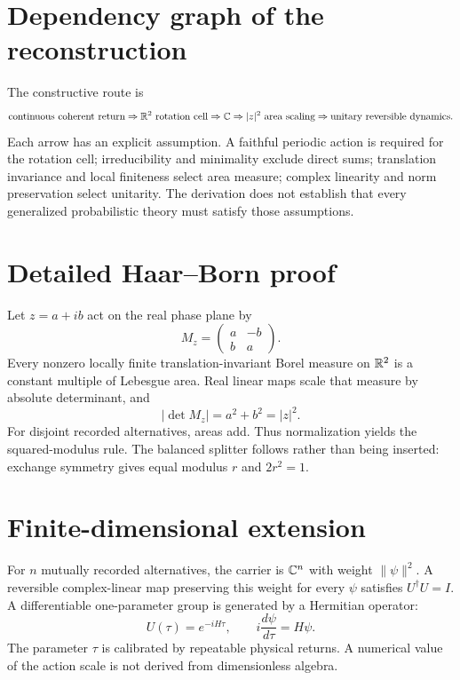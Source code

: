\documentclass[11pt,a4paper]{article}
\begin{document}
\section{Dependency graph of the reconstruction}
The constructive route is
\begin{equation}
\text{continuous coherent return}
\Rightarrow \mathbb{R}^2\text{ rotation cell}
\Rightarrow \mathbb{C}
\Rightarrow |z|^2\text{ area scaling}
\Rightarrow \text{unitary reversible dynamics}.
\end{equation}
Each arrow has an explicit assumption. A faithful periodic action is required for the rotation cell; irreducibility and minimality exclude direct sums; translation invariance and local finiteness select area measure; complex linearity and norm preservation select unitarity. The derivation does not establish that every generalized probabilistic theory must satisfy those assumptions.

\section{Detailed Haar--Born proof}
Let $z=a+ib$ act on the real phase plane by
\begin{equation}
M_z=\begin{pmatrix}a&-b\\b&a\end{pmatrix}.
\end{equation}
Every nonzero locally finite translation-invariant Borel measure on $\mathbb{R}^2$ is a constant multiple of Lebesgue area. Real linear maps scale that measure by absolute determinant, and
\begin{equation}
|\det M_z|=a^2+b^2=|z|^2.
\end{equation}
For disjoint recorded alternatives, areas add. Thus normalization yields the squared-modulus rule. The balanced splitter follows rather than being inserted: exchange symmetry gives equal modulus $r$ and $2r^2=1$.

\section{Finite-dimensional extension}
For $n$ mutually recorded alternatives, the carrier is $\mathbb{C}^n$ with weight $\|\psi\|^2$. A reversible complex-linear map preserving this weight for every $\psi$ satisfies $U^\dagger U=I$. A differentiable one-parameter group is generated by a Hermitian operator:
\begin{equation}
U(\tau)=e^{-iH\tau},\qquad i\frac{d\psi}{d\tau}=H\psi.
\end{equation}
The parameter $\tau$ is calibrated by repeatable physical returns. A numerical value of the action scale is not derived from dimensionless algebra.
\end{document}
